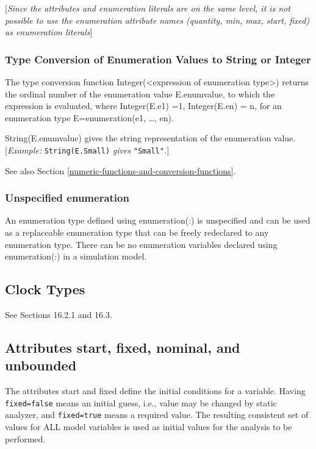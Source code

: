 \documentclass[10pt,a4paper]{report}
\def\Mcomment#1{{[}\emph{#1}{]}}
\def\Mcommentbegin#1{{[}\emph{#1}}
\def\Mcommentend#1{\emph{#1}{]}}
\def\Mcommentmid#1{\emph{#1}}
\def\doublelabel#1{\label{#1}\hypertarget{#1}{}}
\begin{document}
\Mcomment{Since the attributes and enumeration literals are on the same
level, it is not possible to use the enumeration attribute names
(quantity, min, max, start, fixed) as enumeration literals}

\subsubsection{Type Conversion of Enumeration Values to String or Integer}\doublelabel{type-conversion-of-enumeration-values-to-string-or-integer}

The type conversion function Integer(\textless{}expression of
enumeration type\textgreater{}) returns the ordinal number of the
enumeration value E.enumvalue, to which the expression is evaluated,
where Integer(E.e1) =1, Integer(E.en) = n, for an enumeration type
E=enumeration(e1, \ldots{}, en).

String(E.enumvalue) gives the string representation of the enumeration
value. \Mcommentbegin{Example:} \lstinline{String(E.Small)} \Mcommentmid{gives}
\lstinline{"Small"}\Mcommentend{.}

See also Section \ref{numeric-functions-and-conversion-functions}.

\subsubsection{Unspecified enumeration}\doublelabel{unspecified-enumeration}

An enumeration type defined using enumeration(:) is unspecified and can
be used as a replaceable enumeration type that can be freely redeclared
to any enumeration type. There can be no enumeration variables declared
using enumeration(:) in a simulation model.

\subsection{Clock Types}\doublelabel{clock-types}

See Sections 16.2.1 and 16.3.

\subsection{Attributes start, fixed, nominal, and unbounded}

The attributes start and fixed define the initial conditions for a
variable. Having \lstinline{fixed=false} means an initial guess, i.e., value may be
changed by static analyzer, and \lstinline{fixed=true} means a required value. The
resulting consistent set of values for ALL model variables is used as
initial values for the analysis to be performed.
\end{document}
